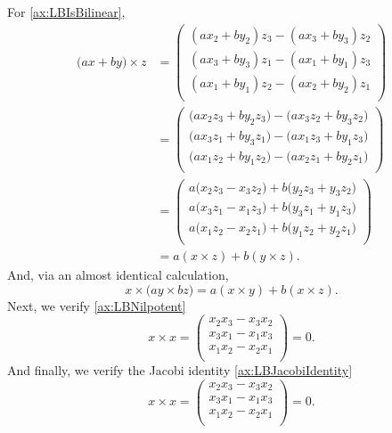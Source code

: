\documentclass{article}
\begin{document}
For \ref{ax:LBIsBilinear},
\begin{align*}
    \Big( ax + by \Big) \times z
    &=
    \begin{pmatrix}
        (ax_2 + by_2)z_3 - (ax_3 + by_3)z_2 \\
        (ax_3 + by_3)z_1 - (ax_1 + by_1)z_3 \\
        (ax_1 + by_1)z_2 - (ax_2 + by_2)z_1 \\
    \end{pmatrix}
    \\
    &=
    \begin{pmatrix}
        \Big(ax_2z_3 + by_2z_3\Big) - \Big(ax_3z_2 + by_3z_2\Big) \\
        \Big(ax_3z_1 + by_3z_1\Big) - \Big(ax_1z_3 + by_1z_3\Big) \\
        \Big(ax_1z_2 + by_1z_2\Big) - \Big(ax_2z_1 + by_2z_1\Big) \\
    \end{pmatrix}
    \\
    &=
    \begin{pmatrix}
        a\Big(x_2z_3 - x_3z_2\Big) + b\Big(y_2z_3 + y_3z_2\Big) \\
        a\Big(x_3z_1 - x_1z_3\Big) + b\Big(y_3z_1 + y_1z_3\Big) \\
        a\Big(x_1z_2 - x_2z_1\Big) + b\Big(y_1z_2 + y_2z_1\Big) \\
    \end{pmatrix}
    \\
    &=
    a(x \times z) + b (y \times z).
\end{align*}
And, via an almost identical calculation,
\[
    x \times \Big(ay \times bz\Big) = a(x \times y) + b(x \times z).
\]
Next, we verify \ref{ax:LBNilpotent}
\[
    x \times x
    =
    \begin{pmatrix}
        x_2x_3 - x_3x_2 \\
        x_3x_1 - x_1x_3 \\
        x_1x_2 - x_2x_1 \\
    \end{pmatrix}
    =
    0.
\]
And finally, we verify the Jacobi identity \ref{ax:LBJacobiIdentity}
\[
    x \times x
    =
    \begin{pmatrix}
        x_2x_3 - x_3x_2 \\
        x_3x_1 - x_1x_3 \\
        x_1x_2 - x_2x_1 \\
    \end{pmatrix}
    =
    0.
\]
\end{document}
